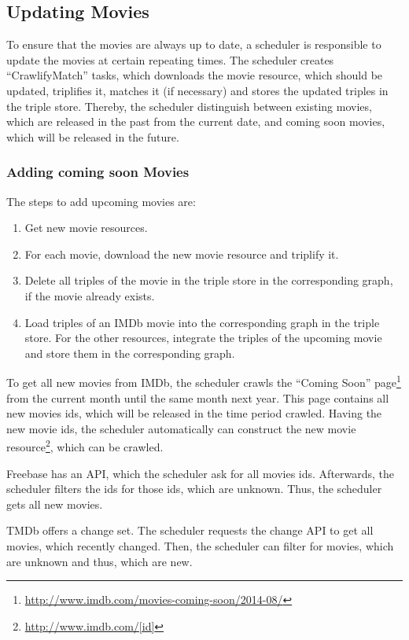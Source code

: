 \subsection{Updating Movies}
\label{subsec_method_updating}

To ensure that the movies are always up to date, a scheduler is responsible to update the movies at certain repeating times.
The scheduler creates ``CrawlifyMatch'' tasks, which downloads the movie resource, which should be updated, triplifies it, matches it (if necessary) and stores the updated triples in the triple store.
Thereby, the scheduler distinguish between existing movies, which are released in the past from the current date, and coming soon movies, which will be released in the future.

\subsubsection{Adding coming soon Movies}
The steps to add upcoming movies are:
\begin {enumerate}
	\item Get new movie resources.
	\item For each movie, download the new movie resource and triplify it.
	\item Delete all triples of the movie in the triple store in the corresponding graph, if the movie already exists.
	\item Load triples of an IMDb movie into the corresponding graph in the triple store. For the other resources, integrate the triples of the upcoming movie and store them in the corresponding graph.
\end{enumerate}

To get all new movies from IMDb, the scheduler crawls the ``Coming Soon'' page\footnote{\url{http://www.imdb.com/movies-coming-soon/2014-08/}} from the current month until the same month next year.
This page contains all new movies ids, which will be released in the time period crawled.
Having the new movie ids, the scheduler automatically can construct the new movie resource\footnote{\url{http://www.imdb.com/[id]}}, which can be crawled.

Freebase has an API, which the scheduler ask for all movies ids.
Afterwards, the scheduler filters the ids for those ids, which are unknown.
Thus, the scheduler gets all new movies.

TMDb offers a change set.
The scheduler requests the change API to get all movies, which recently changed.
Then, the scheduler can filter for movies, which are unknown and thus, which are new.

